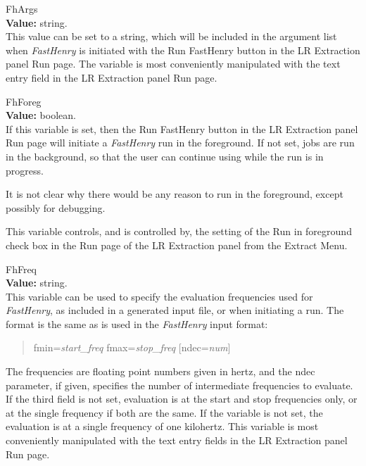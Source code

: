 \begin{description}
\item{\et FhArgs}\\
{\bf Value:} string.\\
This value can be set to a string, which will be included in the
argument list when {\it FastHenry} is initiated with the {\cb Run
FastHenry} button in the {\cb LR Extraction} panel {\cb Run} page. 
The variable is most conveniently manipulated with the text entry
field in the {\cb LR Extraction} panel {\cb Run} page.

\item{\et FhForeg}\\
{\bf Value:} boolean.\\
If this variable is set, then the {\cb Run FastHenry} button in the
{\cb LR Extraction} panel {\cb Run} page will initiate a {\it
FastHenry} run in the foreground.  If not set, jobs are run in the
background, so that the user can continue using {\Xic} while the run
is in progress.

It is not clear why there would be any reason to run in the
foreground, except possibly for debugging.

This variable controls, and is controlled by, the setting of the {\cb
Run in foreground} check box in the {\cb Run} page of the {\cb LR
Extraction} panel from the {\cb Extract Menu}.

\item{\et FhFreq}\\
{\bf Value:} string.\\
This variable can be used to specify the evaluation frequencies used
for {\it FastHenry}, as included in a generated input file, or when
initiating a run.  The format is the same as is used in the {\it
FastHenry} input format:
\begin{quote}
{\vt fmin=}{\it start\_freq} {\vt fmax=}{\it stop\_freq}
     [{\vt ndec=}{\it num\/}]
\end{quote}
The frequencies are floating point numbers given in hertz, and the
{\vt ndec} parameter, if given, specifies the number of intermediate
frequencies to evaluate.  If the third field is not set, evaluation is
at the start and stop frequencies only, or at the single frequency if
both are the same.  If the variable is not set, the evaluation is at a
single frequency of one kilohertz.  This variable is most conveniently
manipulated with the text entry fields in the {\cb LR Extraction}
panel {\cb Run} page.


\end{description}
